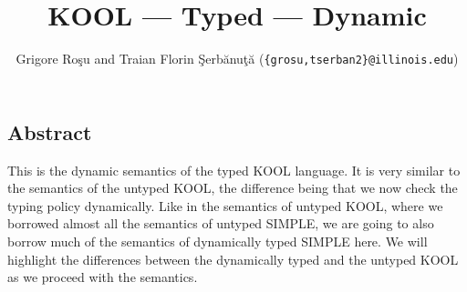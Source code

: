 \setlength{\parindent}{1em}
\title{KOOL --- Typed --- Dynamic}
\author{Grigore Ro\c{s}u and 
        Traian Florin \c{S}erb\u{a}nu\c{t}\u{a}
        (\texttt{\{grosu,tserban2\}@illinois.edu})}

\maketitle

\begin{latexComment}
\section{Abstract}
This is the \K dynamic semantics of the typed KOOL language.
It is very similar to the semantics of the untyped KOOL, the
difference being that we now check the typing policy dynamically.
Like in the semantics of untyped KOOL, where we borrowed almost all
the semantics of untyped SIMPLE, we are going to also borrow much of
the semantics of dynamically typed SIMPLE here.  We will
highlight the differences between the dynamically typed and the
untyped KOOL as we proceed with the semantics.
\end{latexComment}

\vspace*{3ex}

